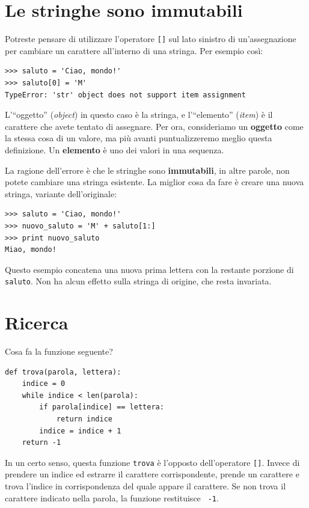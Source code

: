 \documentclass[10pt]{book}
\begin{document}
\section{Le stringhe sono immutabili}

Potreste pensare di utilizzare l'operatore {\tt []} sul lato sinistro di un'assegnazione per cambiare un carattere all'interno di una stringa. Per esempio così:

\begin{verbatim}
>>> saluto = 'Ciao, mondo!'
>>> saluto[0] = 'M'
TypeError: 'str' object does not support item assignment
\end{verbatim}
%
L'``oggetto'' ({\em object}) in questo caso è la stringa, e l'``elemento'' ({\em item}) è il carattere che avete tentato di assegnare. Per ora, consideriamo un {\bf oggetto} come la stessa cosa di un valore, ma più avanti puntualizzeremo meglio questa definizione. Un {\bf elemento} è uno dei valori in una sequenza.

La ragione dell'errore è che le stringhe sono {\bf immutabili}, in altre parole, non potete cambiare una stringa esistente. La miglior cosa da fare è creare una nuova stringa, variante dell'originale:

\begin{verbatim}
>>> saluto = 'Ciao, mondo!'
>>> nuovo_saluto = 'M' + saluto[1:]
>>> print nuovo_saluto
Miao, mondo!
\end{verbatim}
%
Questo esempio concatena una nuova prima lettera con la restante porzione di {\tt saluto}. Non ha alcun effetto sulla stringa di origine, che resta invariata.


\section{Ricerca}
\label{find}

Cosa fa la funzione seguente?

\begin{verbatim}
def trova(parola, lettera):
    indice = 0
    while indice < len(parola):
        if parola[indice] == lettera:
            return indice
        indice = indice + 1
    return -1
\end{verbatim}
%
In un certo senso, questa funzione {\tt trova} è l'opposto dell'operatore {\tt []}.
Invece di prendere un indice ed estrarre il carattere corrispondente, prende un carattere e trova l'indice in corrispondenza del quale appare il carattere. Se non trova il carattere indicato nella parola, la funzione restituisce {\tt
-1}.
\end{document}
